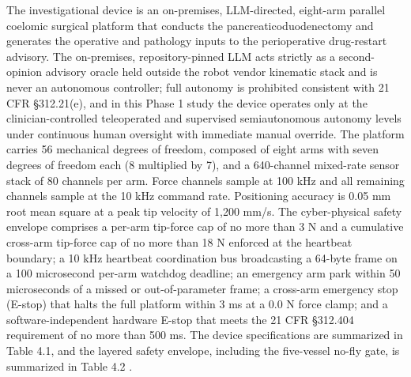 The investigational device is an on-premises, LLM-directed, eight-arm parallel
coelomic surgical platform that conducts the pancreaticoduodenectomy and generates
the operative and pathology inputs to the perioperative drug-restart advisory. The
on-premises, repository-pinned LLM acts strictly as a second-opinion advisory
oracle held outside the robot vendor kinematic stack and is never an autonomous
controller; full autonomy is prohibited consistent with 21 CFR \S 312.21(e), and
in this Phase 1 study the device operates only at the clinician-controlled
teleoperated and supervised semiautonomous autonomy levels under continuous human
oversight with immediate manual override. The platform carries 56 mechanical
degrees of freedom, composed of eight arms with seven degrees of freedom each
(8 multiplied by 7), and a 640-channel mixed-rate sensor stack of 80 channels per
arm. Force channels sample at 100 kHz and all remaining channels sample at the
10 kHz command rate. Positioning accuracy is 0.05 mm root mean square at a peak tip
velocity of 1,200 mm/s. The cyber-physical safety envelope comprises a per-arm
tip-force cap of no more than 3 N and a cumulative cross-arm tip-force cap of no
more than 18 N enforced at the heartbeat boundary; a 10 kHz heartbeat coordination
bus broadcasting a 64-byte frame on a 100 microsecond per-arm watchdog deadline; an
emergency arm park within 50 microseconds of a missed or out-of-parameter frame; a
cross-arm emergency stop (E-stop) that halts the full platform within 3 ms at a
0.0 N force clamp; and a software-independent hardware E-stop that meets the 21 CFR
\S 312.404 requirement of no more than 500 ms. The device specifications are
summarized in Table 4.1, and the layered safety envelope, including the five-vessel
no-fly gate, is summarized in Table 4.2 \cite{daraxwhipple,onpremwhippl}.

